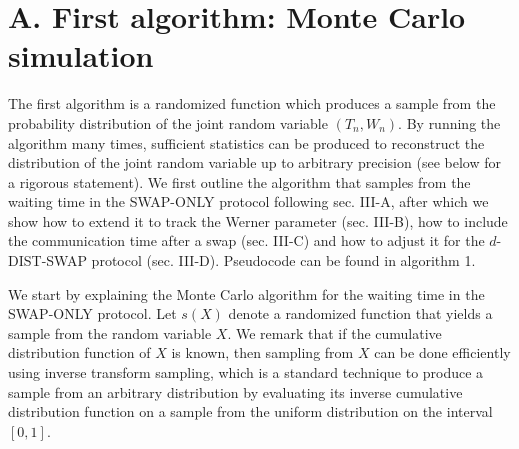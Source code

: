 \documentclass[10pt]{article}
\begin{document}
\section*{A. First algorithm: Monte Carlo simulation}
The first algorithm is a randomized function which produces a sample from the probability distribution of the joint random variable $\left(T_{n}, W_{n}\right)$. By running the algorithm many times, sufficient statistics can be produced to reconstruct the distribution of the joint random variable up to arbitrary precision (see below for a rigorous statement). We first outline the algorithm that samples from the waiting time in the SWAP-ONLY protocol following sec. III-A, after which we show how to extend it to track the Werner parameter (sec. III-B), how to include the communication time after a swap (sec. III-C) and how to adjust it for the $d$-DIST-SWAP protocol (sec. III-D). Pseudocode can be found in algorithm 1.

We start by explaining the Monte Carlo algorithm for the waiting time in the SWAP-ONLY protocol. Let $s(X)$ denote a randomized function that yields a sample from the random variable $X$. We remark that if the cumulative distribution function of $X$ is known, then sampling from $X$ can be done efficiently using inverse transform sampling, which is a standard technique to produce a sample from an arbitrary distribution by evaluating its inverse cumulative distribution function on a sample from the uniform distribution on the interval $[0,1]$.
\end{document}
